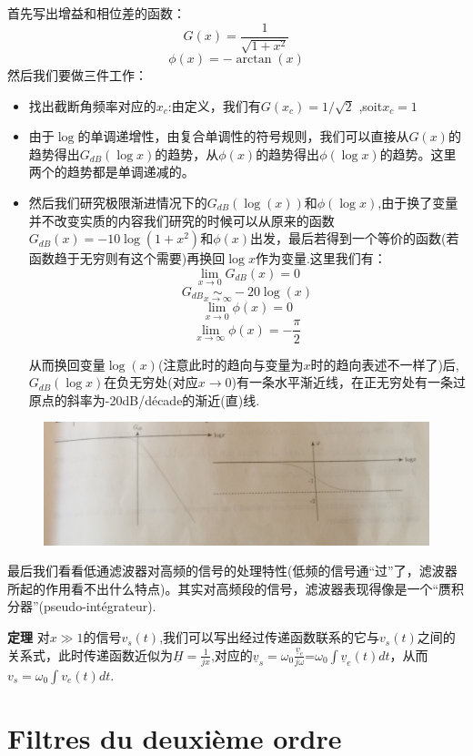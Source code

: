 \documentclass[12pt]{book}
\theoremstyle{definition}\newtheorem{dfn}{Définition}[chapter]
\theoremstyle{plain}\newtheorem{thm}{Théorème}[chapter]
\theoremstyle{plain}\newtheorem{prp}{Proposition}[chapter]
\theoremstyle{plain}\newtheorem{lem}{\bf Lemme}[chapter]
\theoremstyle{plain}\newtheorem{axm}{\bf Axiome}[chapter]
\theoremstyle{plain}\newtheorem{lmm}{\bf Lemme}[chapter]
\theoremstyle{plain}\newtheorem{cor}{\bf Corollaire}[chapter]
\theoremstyle{remark}\newtheorem{rem}{Remarque}[chapter]
\begin{document}
首先写出增益和相位差的函数：
$$
G(x)=\frac{1}{\sqrt{1+x^2}}
$$
$$
\phi(x)=-\arctan(x)
$$
然后我们要做三件工作：
\begin{itemize}
	\item 找出截断角频率对应的$x_c$:由定义，我们有$G(x_c)=1/\sqrt{2}$ ,soit$x_c=1$
	\item 
	由于$\log$的单调递增性，由复合单调性的符号规则，我们可以直接从$G(x)$的趋势得出$G_{dB}(\log x)$的趋势，从$\phi(x)$的趋势得出$\phi(\log x)$的趋势。这里两个的趋势都是单调递减的。
	\item 然后我们研究极限渐进情况下的$G_{dB}(\log(x))$和$\phi(\log x)$,由于换了变量并不改变实质的内容我们研究的时候可以从原来的函数$G_{dB}(x)=-10\log(1+x^2)$和$\phi(x)$出发，最后若得到一个等价的函数(若函数趋于无穷则有这个需要)再换回$\log x$作为变量.这里我们有：
	$$
	\lim\limits_{x\to 0}G_{dB}(x)=0
	$$
	$$
	G_{dB}\underset{x\to\infty}{\sim}-20\log(x)
	$$
	$$
	\lim\limits_{x\to0}\phi(x)=0
	$$
	$$
	\lim\limits_{x\to \infty}\phi(x)=-\frac{\pi}{2}
	$$
	
	从而换回变量$\log(x)$(注意此时的趋向与变量为$x$时的趋向表述不一样了)后,$G_{dB}(\log x)$在负无穷处(对应$x\to0$)有一条水平渐近线，在正无穷处有一条过原点的斜率为-20dB/décade的渐近(直)线.
\end{itemize}

\begin{figure}[H]
	\centering
	\includegraphics[scale=0.16]{image//Filtrage//4}
\end{figure}

最后我们看看低通滤波器对高频的信号的处理特性(低频的信号通“过”了，滤波器所起的作用看不出什么特点)。其实对高频段的信号，滤波器表现得像是一个“赝积分器”(pseudo-intégrateur).
\begin{framed}{\textbf{定理}}
	对$x\gg1$的信号$v_s(t)$,我们可以写出经过传递函数联系的它与$v_s(t)$之间的关系式，此时传递函数近似为$\underline{H}=\frac{1}{jx}$,对应的$\underline{v}_s=\omega_0\frac{\underline{v}_e}{j\omega}$=$\omega_0$$\int\underline{v}_e(t)dt$，从而$v_s=\omega_0\int v_e(t)dt$.
\end{framed}

\section{Filtres du deuxième ordre}
\end{document}
